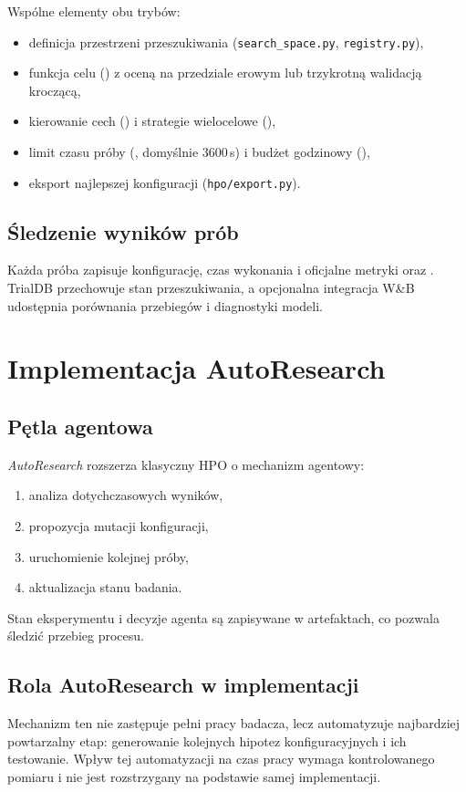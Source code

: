 \documentclass[12pt,a4paper]{report}
\begin{document}
Wspólne elementy obu trybów:
\begin{itemize}\item definicja przestrzeni przeszukiwania (\texttt{search\_space.py}, \texttt{registry.py}),
\item funkcja celu () z oceną na przedziale erowym lub
    trzykrotną walidacją kroczącą,
\item kierowanie cech () i strategie wielocelowe
    (),
\item limit czasu próby (, domyślnie 3600\,s)
    i budżet godzinowy (),
\item eksport najlepszej konfiguracji (\texttt{hpo/export.py}).\end{itemize}

\subsection{Śledzenie wyników prób}
Każda próba zapisuje konfigurację, czas wykonania i oficjalne metryki
 oraz . TrialDB przechowuje stan
przeszukiwania, a opcjonalna integracja W\&B udostępnia porównania przebiegów i
diagnostyki modeli.

\section{Implementacja AutoResearch}
\subsection{Pętla agentowa}
\textit{AutoResearch} rozszerza klasyczny HPO o mechanizm agentowy:
\begin{enumerate}\item analiza dotychczasowych wyników,
\item propozycja mutacji konfiguracji,
\item uruchomienie kolejnej próby,
\item aktualizacja stanu badania.\end{enumerate}

Stan eksperymentu i decyzje agenta są zapisywane w artefaktach, co pozwala śledzić
przebieg procesu.

\subsection{Rola AutoResearch w implementacji}
Mechanizm ten nie zastępuje pełni pracy badacza, lecz automatyzuje najbardziej
powtarzalny etap: generowanie kolejnych hipotez konfiguracyjnych i ich testowanie.
Wpływ tej automatyzacji na czas pracy wymaga kontrolowanego pomiaru i nie jest
rozstrzygany na podstawie samej implementacji.
\end{document}
